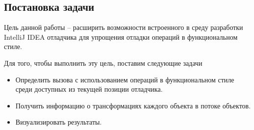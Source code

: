 \subsection{Постановка задачи}
Цель данной работы -- расширить возможности встроенного в среду разработки IntelliJ IDEA отладчика для упрощения отладки операций в функциональном стиле.

Для того, чтобы выполнить эту цель, поставим следующие задачи
\begin{itemize}
	\item Определить вызова с использованием операций в функциональном стиле среди доступных из текущей позиции отладчика.
	\item Получить информацию о трансформациях каждого объекта в потоке объектов.
	\item Визуализировать результаты.
\end{itemize}
